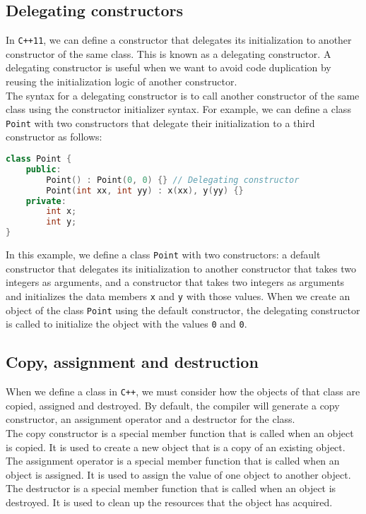 \subsection{Delegating constructors}

In \texttt{C++11}, we can define a constructor that delegates its initialization to another
constructor of the same class. This is known as a delegating constructor. A delegating
constructor is useful when we want to avoid code duplication by reusing the initialization
logic of another constructor.\\

The syntax for a delegating constructor is to call another constructor of the same class
using the constructor initializer syntax. For example, we can define a class \texttt{Point}
with two constructors that delegate their initialization to a third constructor as follows:\\

\begin{lstlisting}[language=C++]
class Point {
    public:
        Point() : Point(0, 0) {} // Delegating constructor
        Point(int xx, int yy) : x(xx), y(yy) {}
    private:
        int x;
        int y;
}
\end{lstlisting}

In this example, we define a class \texttt{Point} with two constructors: a default constructor
that delegates its initialization to another constructor that takes two integers as arguments,
and a constructor that takes two integers as arguments and initializes the data members \texttt{x}
and \texttt{y} with those values. When we create an object of the class \texttt{Point} using the
default constructor, the delegating constructor is called to initialize the object with the values
\texttt{0} and \texttt{0}.

\subsection{Copy, assignment and destruction}

When we define a class in \texttt{C++}, we must consider how the objects of that class are
copied, assigned and destroyed. By default, the compiler will generate a copy constructor, an
assignment operator and a destructor for the class.\\

The copy constructor is a special member function that is called when an object is copied. It
is used to create a new object that is a copy of an existing object. The assignment operator
is a special member function that is called when an object is assigned. It is used to assign
the value of one object to another object. The destructor is a special member function that
is called when an object is destroyed. It is used to clean up the resources that the object
has acquired.

